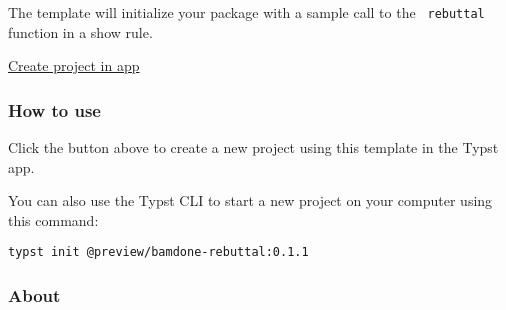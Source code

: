 The template will initialize your package with a sample call to the
\texttt{\ rebuttal\ } function in a show rule.

\begin{Shaded}
\begin{Highlighting}[]
\NormalTok{)}

\NormalTok{)}

\end{Highlighting}
\end{Shaded}

\href{/app?template=bamdone-rebuttal&version=0.1.1}{Create project in
app}

\subsubsection{How to use}\label{how-to-use}

Click the button above to create a new project using this template in
the Typst app.

You can also use the Typst CLI to start a new project on your computer
using this command:

\begin{verbatim}
typst init @preview/bamdone-rebuttal:0.1.1
\end{verbatim}



\subsubsection{About}\label{about}

